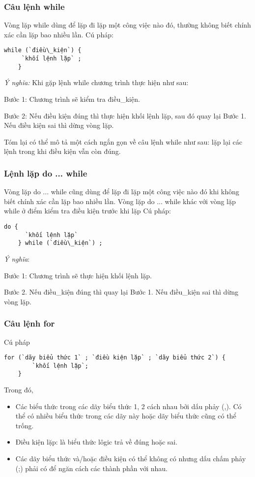 \subsubsection{Câu lệnh while}
Vòng lặp {\ttfamily while} dùng để lặp đi lặp một công việc nào đó, thường không biết chính xác cần lặp bao nhiều lần.
Cú pháp: 
\lstset{language=C++}
\begin{lstlisting}[escapechar=`]
	while (`điều\_kiện`) { 
	 `khối lệnh lặp` ; 
	}
\end{lstlisting}
\textit{Ý nghĩa:} Khi gặp lệnh {\ttfamily while} chương trình thực hiện như sau: 

Bước 1: Chương trình sẽ kiểm tra {\ttfamily điều\_kiện}.

Bước 2: Nếu điều kiện đúng thì thực hiện khối lệnh lặp, sau đó quay lại Bước 1. Nếu điều kiện sai thì dừng vòng lặp.

Tóm lại có thể mô tả một cách ngắn gọn về câu lệnh {\ttfamily while} như sau: lặp lại các lệnh trong khi điều kiện vẫn còn đúng.
\subsubsection{Lệnh lặp do ... while }
Vòng lặp {\ttfamily  do ... while} cũng dùng để lặp đi lặp một công việc nào đó khi không biết chính xác cần lặp bao nhiều lần. Vòng lặp {\ttfamily  do ... while} khác với vòng lặp {\ttfamily while} ở điểm kiểm tra điều kiện trước khi lặp
Cú pháp: 
\lstset{language=C++}
\begin{lstlisting}[escapechar=`]
	do {
	  `khối lệnh lặp`
	} while (`điều\_kiện`) ; 
\end{lstlisting}

\textit{Ý nghĩa}:  

Bước 1: Chương trình sẽ thực hiện khối lệnh lặp.

Bước 2. Nếu {\ttfamily điều\_kiện}  đúng thì quay lại Bước 1. Nếu {\ttfamily điều\_kiện}  sai thì dừng vòng lặp.
\subsubsection{Câu lệnh for}
Cú pháp 
\lstset{language=C++}
\begin{lstlisting}[escapechar=`]
	for (`dãy biểu thức 1` ; `điều kiện lặp` ; `dãy biểu thức 2`) { 
		`khối lệnh lặp`; 
	}
\end{lstlisting}
Trong đó,
\begin{itemize}

\item  Các biểu thức trong các dãy biểu thức 1, 2 cách nhau bởi dấu phảy (,). Có thể
có nhiều biểu thức trong các dãy này hoặc dãy biểu thức cũng có thể trống. 
\item Điều kiện lặp: là biểu thức lôgic trả về đúng hoặc  sai. 
\item   Các dãy biểu thức và/hoặc điều kiện có thể không có nhưng dấu 
chấm phảy (;) phải có để ngăn cách các thành phần với nhau. 

\end{itemize}

